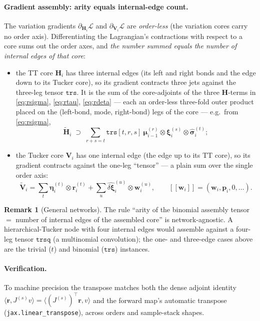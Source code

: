 \documentclass[11pt]{article}
\newcommand{\jet}[1]{[\![ #1 ]\!]}   %
\theoremstyle{definition}
\newtheorem{remark}{Remark}
\theoremstyle{plain}
\begin{document}
\paragraph{Gradient assembly: arity equals internal-edge count.}
The variation gradients $\partial_{\mathbf H_i}\mathcal L$ and $\partial_{\mathbf V_i}
\mathcal L$ are \emph{order-less} (the variation cores carry no order axis). Differentiating the
Lagrangian's contractions with respect to a core sums out the order axes, and \emph{the number summed
equals the number of internal edges of that core}:
\begin{itemize}
  \item the TT core $\mathbf H_i$ has three internal edges (its left and right bonds and the
    edge down to its Tucker core), so its gradient contracts three jets against the three-leg tensor
    $\texttt{trs}$. It is the sum of the core-adjoints of the three $\mathbf H$-terms in
    \eqref{eq:rsigma}, \eqref{eq:rtau}, \eqref{eq:rdeta} --- each an order-less three-fold outer
    product placed on the (left-bond, mode, right-bond) legs of the core --- e.g.\ from
    \eqref{eq:rsigma},
    \[
      \widetilde{\mathbf H}_i \;\supset\; \sum_{r+s=t}\texttt{trs}[t,r,s]\
        \boldsymbol\mu_{i-1}^{(r)} \otimes \boldsymbol\xi_i^{(s)} \otimes \widehat{\boldsymbol\sigma}_i^{(t)};
    \]
  \item the Tucker core $\mathbf V_i$ has one internal edge (the edge up to its TT core), so
    its gradient contracts against the one-leg ``tensor'' --- a plain sum over the single order axis:
    \[
      \widetilde{\mathbf V}_i
      = \sum_t \boldsymbol\eta_i^{(t)} \otimes \mathbf r_i^{(t)}
      + \sum_u \widehat{\delta\boldsymbol\xi}_i^{(u)} \otimes \mathbf w_i^{(u)},
      \qquad \jet{\mathbf w_i} = (\mathbf w_i, \mathbf p_i, 0, \dots).
    \]
\end{itemize}

\begin{remark}[General networks]
\label{rem:arity}
The rule ``arity of the binomial assembly tensor $=$ number of internal edges of the assembled core''
is network-agnostic. A hierarchical-Tucker node with four internal edges would assemble against a
four-leg tensor $\texttt{trsq}$ (a multinomial convolution); the one- and three-edge cases above are
the trivial ($t$) and binomial ($\texttt{trs}$) instances.
\end{remark}

\paragraph{Verification.}
To machine precision the transpose matches both the dense adjoint identity $\langle \mathbf r,
J^{(s)} v\rangle = \langle (J^{(s)})^\top \mathbf r, v\rangle$ and the forward map's automatic
transpose (\texttt{jax.\allowbreak linear\_\allowbreak transpose}), across orders and sample-stack
shapes.
\end{document}
